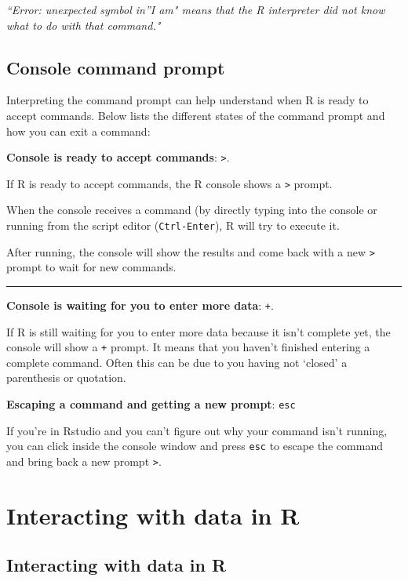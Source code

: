 \documentclass[
]{article}
\begin{document}
\emph{``Error: unexpected symbol in''I am" means that the R interpreter
did not know what to do with that command."}

\hypertarget{console-command-prompt}{%
\subsection{Console command prompt}\label{console-command-prompt}}

Interpreting the command prompt can help understand when R is ready to
accept commands. Below lists the different states of the command prompt
and how you can exit a command:

\textbf{Console is ready to accept commands}: \texttt{\textgreater{}}.

If R is ready to accept commands, the R console shows a
\texttt{\textgreater{}} prompt.

When the console receives a command (by directly typing into the console
or running from the script editor (\texttt{Ctrl-Enter}), R will try to
execute it.

After running, the console will show the results and come back with a
new \texttt{\textgreater{}} prompt to wait for new commands.

\begin{center}\rule{0.5\linewidth}{0.5pt}\end{center}

\textbf{Console is waiting for you to enter more data}: \texttt{+}.

If R is still waiting for you to enter more data because it isn't
complete yet, the console will show a \texttt{+} prompt. It means that
you haven't finished entering a complete command. Often this can be due
to you having not `closed' a parenthesis or quotation.

\textbf{Escaping a command and getting a new prompt}: \texttt{esc}

If you're in Rstudio and you can't figure out why your command isn't
running, you can click inside the console window and press \texttt{esc}
to escape the command and bring back a new prompt
\texttt{\textgreater{}}.

\hypertarget{interacting-with-data-in-r}{%
\section{Interacting with data in R}\label{interacting-with-data-in-r}}

\hypertarget{interacting-with-data-in-r-1}{%
\subsection{Interacting with data in
R}\label{interacting-with-data-in-r-1}}
\end{document}
